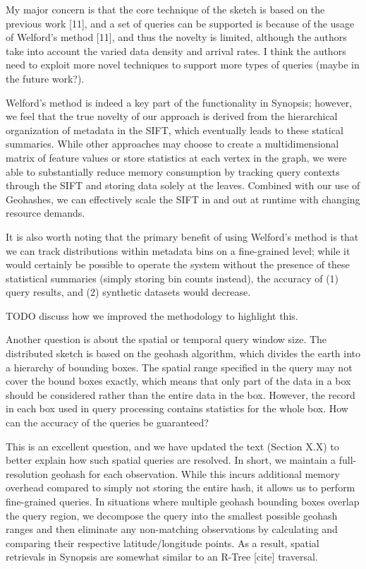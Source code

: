 \documentclass{article}
\begin{document}
My major concern is that the core technique of the sketch is based on
the previous work {[}11{]}, and a set of queries can be supported is
because of the usage of Welford's method {[}11{]}, and thus the novelty
is limited, although the authors take into account the varied data
density and arrival rates. I think the authors need to exploit more
novel techniques to support more types of queries (maybe in the future
work?).

\begin{tcolorbox}
Welford's method is indeed a key part of the functionality in Synopsis;
however, we feel that the true novelty of our approach is derived from
the hierarchical organization of metadata in the SIFT, which eventually
leads to these statical summaries. While other approaches may choose to
create a multidimensional matrix of feature values or store statistics
at each vertex in the graph, we were able to substantially reduce memory
consumption by tracking query contexts through the SIFT and storing data
solely at the leaves. Combined with our use of Geohashes, we can
effectively scale the SIFT in and out at runtime with changing resource
demands.

It is also worth noting that the primary benefit of using Welford's
method is that we can track distributions within metadata bins on a
fine-grained level; while it would certainly be possible to operate the
system without the presence of these statistical summaries (simply
storing bin counts instead), the accuracy of (1) query results, and (2)
synthetic datasets would decrease.

TODO discuss how we improved the methodology to highlight this.
\end{tcolorbox}

Another question is about the spatial or temporal query window size. The
distributed sketch is based on the geohash algorithm, which divides the
earth into a hierarchy of bounding boxes. The spatial range specified in
the query may not cover the bound boxes exactly, which means that only
part of the data in a box should be considered rather than the entire
data in the box. However, the record in each box used in query
processing contains statistics for the whole box. How can the accuracy
of the queries be guaranteed?

\begin{tcolorbox}
This is an excellent question, and we have updated the text (Section
X.X) to better explain how such spatial queries are resolved. In short,
we maintain a full-resolution geohash for each observation. While this
incurs additional memory overhead compared to simply not storing the
entire hash, it allows us to perform fine-grained queries. In situations
where multiple geohash bounding boxes overlap the query region, we
decompose the query into the smallest possible geohash ranges and then
eliminate any non-matching observations by calculating and comparing
their respective latitude/longitude points. As a result, spatial
retrievals in Synopsis are somewhat similar to an R-Tree {[}cite{]}
traversal.
\end{tcolorbox}
\end{document}
